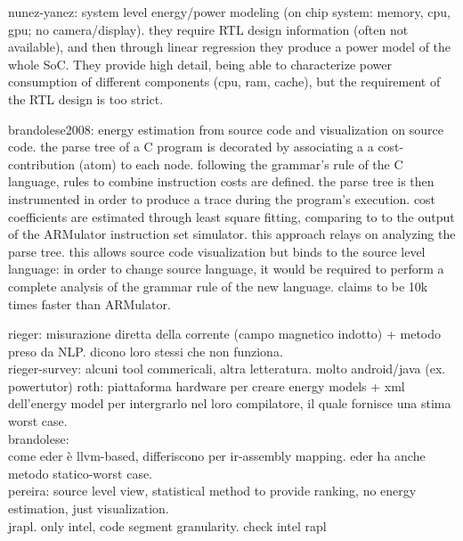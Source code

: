 nunez-yanez: system level energy/power modeling (on chip system: memory, cpu, gpu; no camera/display). they require RTL design information (often not available), and then through linear regression they produce a power model of the whole SoC. They provide high detail, being able to characterize power consumption of different components (cpu, ram, cache), but the requirement of the RTL design is too strict. 

brandolese2008: energy estimation from source code and visualization on source code. the parse tree of a C program is decorated by associating a a cost-contribution (atom) to each node. following the grammar's rule of the C language, rules to combine instruction costs are defined. the parse tree is then instrumented in order to produce a trace during the program's execution. cost coefficients are estimated through least square fitting, comparing to to the output of the ARMulator instruction set simulator.
this approach relays on analyzing the parse tree. this allows source code visualization but binds to the source level language: in order to change source language, it would be required to perform a complete analysis of the grammar rule of the new language.
claims to be 10k times faster than ARMulator.

rieger: misurazione diretta della corrente (campo magnetico indotto) + metodo preso da NLP. dicono loro stessi che non funziona. \\
rieger-survey: alcuni tool commericali, altra letteratura. molto android/java (ex. powertutor)
roth: piattaforma hardware per creare energy models + xml dell'energy model per intergrarlo nel loro compilatore, il quale fornisce una stima worst case. \\
brandolese: \\  come eder è llvm-based, differiscono per ir-assembly mapping. eder ha anche metodo statico-worst case. \\
pereira: source level view, statistical method to provide ranking, no energy estimation, just visualization. \\
jrapl. only intel, code segment granularity. check intel rapl 


